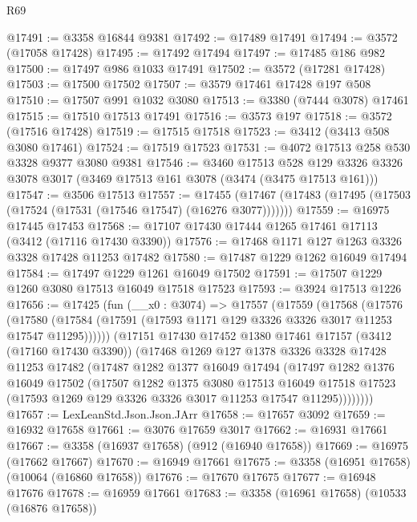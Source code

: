 \begin{lexlean}{R69}
\begin{coremodule}
@17491 := @3358 @16844 @9381
@17492 := @17489 @17491
@17494 := @3572 (@17058 @17428)
@17495 := @17492 @17494
@17497 := @17485 @186 @982
@17500 := @17497 @986 @1033 @17491
@17502 := @3572 (@17281 @17428)
@17503 := @17500 @17502
@17507 := @3579 @17461 @17428 @197 @508
@17510 := @17507 @991 @1032 @3080
@17513 := @3380 (@7444 @3078) @17461
@17515 := @17510 @17513 @17491
@17516 := @3573 @197
@17518 := @3572 (@17516 @17428)
@17519 := @17515 @17518
@17523 := @3412 (@3413 @508 @3080 @17461)
@17524 := @17519 @17523
@17531 := @4072 @17513 @258 @530 @3328 @9377 @3080 @9381
@17546 := @3460
    @17513
    @528
    @129
    @3326
    @3326
    @3078
    @3017
    (@3469 @17513 @161 @3078 (@3474 (@3475 @17513 @161)))
@17547 := @3506 @17513
@17557 := @17455
    (@17467 (@17483 (@17495 (@17503 (@17524 (@17531 (@17546 @17547) (@16276 @3077)))))))
@17559 := @16975 @17445 @17453
@17568 := @17107 @17430 @17444 @1265 @17461 @17113 (@3412 (@17116 @17430 @3390))
@17576 := @17468 @1171 @127 @1263 @3326 @3328 @17428 @11253 @17482
@17580 := @17487 @1229 @1262 @16049 @17494
@17584 := @17497 @1229 @1261 @16049 @17502
@17591 := @17507 @1229 @1260 @3080 @17513 @16049 @17518 @17523
@17593 := @3924 @17513 @1226
@17656 := @17425
    (fun (__x0 : @3074) =>
    @17557
      (@17559
        (@17568
          (@17576
            (@17580 (@17584 (@17591 (@17593 @1171 @129 @3326 @3326 @3017 @11253 @17547 @11295))))))
        (@17151
          @17430
          @17452
          @1380
          @17461
          @17157
          (@3412 (@17160 @17430 @3390))
          (@17468
            @1269
            @127
            @1378
            @3326
            @3328
            @17428
            @11253
            @17482
            (@17487
              @1282
              @1377
              @16049
              @17494
              (@17497
                @1282
                @1376
                @16049
                @17502
                (@17507
                  @1282
                  @1375
                  @3080
                  @17513
                  @16049
                  @17518
                  @17523
                  (@17593 @1269 @129 @3326 @3326 @3017 @11253 @17547 @11295))))))))
@17657 := LexLeanStd.Json.Json.JArr
@17658 := @17657 @3092
@17659 := @16932 @17658
@17661 := @3076 @17659 @3017
@17662 := @16931 @17661
@17667 := @3358 (@16937 @17658) (@912 (@16940 @17658))
@17669 := @16975 (@17662 @17667)
@17670 := @16949 @17661
@17675 := @3358 (@16951 @17658) (@10064 (@16860 @17658))
@17676 := @17670 @17675
@17677 := @16948 @17676
@17678 := @16959 @17661
@17683 := @3358 (@16961 @17658) (@10533 (@16876 @17658))

\end{coremodule}
\end{lexlean}
